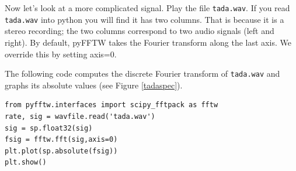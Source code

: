 Now let's look at a more complicated signal. Play the file \texttt{tada.wav}.
If you read \texttt{tada.wav} into python you will find it has two columns.
That is because it is a stereo recording; the two columns correspond to two audio signals (left and right).
By default, pyFFTW takes the Fourier transform along the last axis. We override this by setting axis=0.

The following code computes the discrete Fourier transform of \texttt{tada.wav} and graphs its absolute values (see Figure \ref{tadaspec}).
\begin{lstlisting}
from pyfftw.interfaces import scipy_fftpack as fftw
rate, sig = wavfile.read('tada.wav')
sig = sp.float32(sig)
fsig = fftw.fft(sig,axis=0)
plt.plot(sp.absolute(fsig))
plt.show()
\end{lstlisting}


